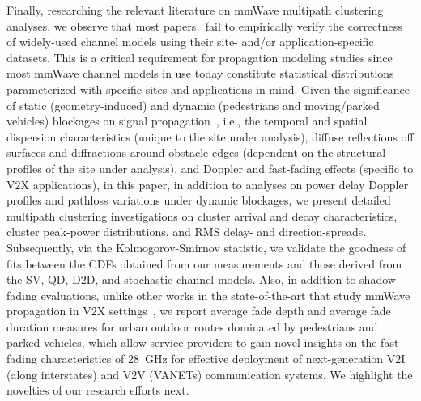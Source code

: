 \documentclass[12pt, draftcls, onecolumn]{IEEEtran}
\begin{document}
Finally, researching the relevant literature on mmWave multipath clustering analyses, we observe that most papers~\cite{Outdoor28G, PDAPs, D2DHumanBlockage, DopplerHST, V2XBlockages, MacCartneyUrbanHumanBlockage} fail to empirically verify the correctness of widely-used channel models using their site- and/or application-specific datasets. This is a critical requirement for propagation modeling studies since most mmWave channel models in use today constitute statistical distributions parameterized with specific sites and applications in mind. Given the significance of static (geometry-induced) and dynamic (pedestrians and moving/parked vehicles) blockages on signal propagation~\cite{Rappaport}, i.e., the temporal and spatial dispersion characteristics (unique to the site under analysis), diffuse reflections off surfaces and diffractions around obstacle-edges (dependent on the structural profiles of the site under analysis), and Doppler and fast-fading effects (specific to V$2$X applications), in this paper, in addition to analyses on power delay Doppler profiles and pathloss variations under dynamic blockages, we present detailed multipath clustering investigations on cluster arrival and decay characteristics, cluster peak-power distributions, and RMS delay- and direction-spreads. Subsequently, via the Kolmogorov-Smirnov statistic, we validate the goodness of fits between the CDFs obtained from our measurements and those derived from the SV, QD, D$2$D, and stochastic channel models. Also, in addition to shadow-fading evaluations, unlike other works in the state-of-the-art that study mmWave propagation in V$2$X settings~\cite{DopplerHST, V2XBlockages, MacCartneyUrbanHumanBlockage}, we report average fade depth and average fade duration measures for urban outdoor routes dominated by pedestrians and parked vehicles, which allow service providers to gain novel insights on the fast-fading characteristics of \SI{28}{\giga\hertz} for effective deployment of next-generation V$2$I (along interstates) and V$2$V (VANETs) communication systems. We highlight the novelties of our research efforts next.
\end{document}
